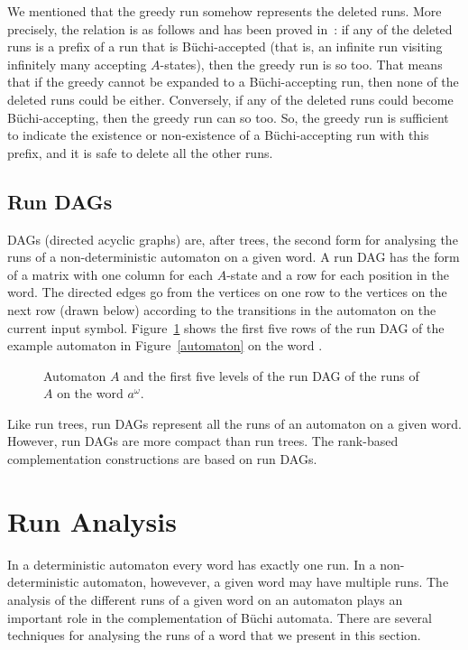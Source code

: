 We mentioned that the greedy run somehow represents the deleted runs. More precisely, the relation is as follows and has been proved in~\cite{vardi2007automata}: if any of the deleted runs is a prefix of a run that is Büchi-accepted (that is, an infinite run visiting infinitely many accepting $A$-states), then the greedy run is so too. That means that if the greedy cannot be expanded to a Büchi-accepting run, then none of the deleted runs could be either. Conversely, if any of the deleted runs could become Büchi-accepting, then the greedy run can so too. So, the greedy run is sufficient to indicate the existence or non-existence of a Büchi-accepting run with this prefix, and it is safe to delete all the other runs.

\subsection{Run DAGs}
DAGs (directed acyclic graphs) are, after trees, the second form for analysing the runs of a non-deterministic automaton on a given word. A run DAG has the form of a matrix with one column for each $A$-state and a row for each position in the word. The directed edges go from the vertices on one row to the vertices on the next row (drawn below) according to the transitions in the automaton on the current input symbol. Figure~\ref{run_dag} shows the first five rows of the run DAG of the example automaton in Figure~\ref{automaton} on the word \aom. 

\begin{figure}
\centering
\RunDAG
\caption{Automaton $A$ and the first five levels of the run DAG of the runs of $A$ on the word $a^\omega$.}
\label{run_dag}
\end{figure}

Like run trees, run DAGs represent all the runs of an automaton on a given word. However, run DAGs are more compact than run trees. The rank-based complementation constructions are based on run DAGs. 



\section{Run Analysis}
In a deterministic automaton every word has exactly one run. In a non-deterministic automaton, howevever, a given word may have multiple runs. The analysis of the different runs of a given word on an automaton plays an important role in the complementation of Büchi automata. There are several techniques for analysing the runs of a word that we present in this section.

